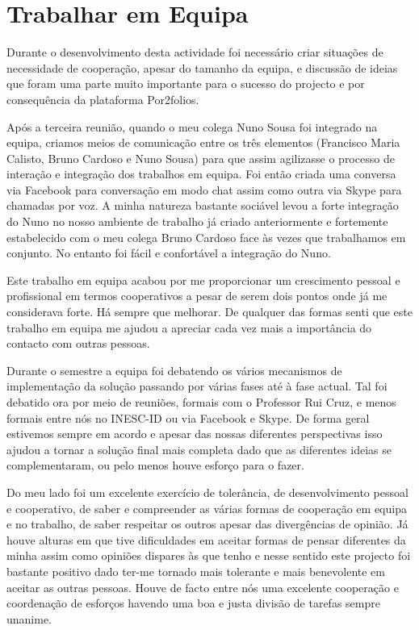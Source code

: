 \documentclass[a4paper,12pt,journal,twoside,compsoc]{PPIEEEtran}
\begin{document}

\clearpage

\section{Trabalhar em Equipa}

Durante o desenvolvimento desta actividade foi necessário criar situações de necessidade de cooperação, apesar do tamanho da equipa, e discussão de ideias que foram uma parte muito importante para o sucesso do projecto e por consequência da plataforma Por2folios.

Após a terceira reunião, quando o meu colega Nuno Sousa foi integrado na equipa, criamos meios de comunicação entre os três elementos (Francisco Maria Calisto, Bruno Cardoso e Nuno Sousa) para que assim agilizasse o processo de interação e integração dos trabalhos em equipa. Foi então criada uma conversa via Facebook para conversação em modo chat assim como outra via Skype para chamadas por voz. A minha natureza bastante sociável levou a forte integração do Nuno no nosso ambiente de trabalho já criado anteriormente e fortemente estabelecido com o meu colega Bruno Cardoso face às vezes que trabalhamos em conjunto. No entanto foi fácil e confortável a integração do Nuno.

Este trabalho em equipa acabou por me proporcionar um crescimento pessoal e profissional em termos cooperativos a pesar de serem dois pontos onde já me considerava forte. Há sempre que melhorar. De qualquer das formas senti que este trabalho em equipa me ajudou a apreciar cada vez mais a importância do contacto com outras pessoas.

Durante o semestre a equipa foi debatendo os vários mecanismos de implementação da solução passando por várias fases até à fase actual. Tal foi debatido ora por meio de reuniões, formais com o Professor Rui Cruz, e menos formais entre nós no \ac{INESC-ID} ou via Facebook e Skype. De forma geral estivemos sempre em acordo e apesar das nossas diferentes perspectivas isso ajudou a tornar a solução final mais completa dado que as diferentes ideias se complementaram, ou pelo menos houve esforço para o fazer.

Do meu lado foi um excelente exercício de tolerância, de desenvolvimento pessoal e cooperativo, de saber e compreender as várias formas de cooperação em equipa e no trabalho, de saber respeitar os outros apesar das divergências de opinião. Já houve alturas em que tive dificuldades em aceitar formas de pensar diferentes da minha assim como opiniões dispares às que tenho e nesse sentido este projecto foi bastante positivo dado ter-me tornado mais tolerante e mais benevolente em aceitar as outras pessoas. Houve de facto entre nós uma excelente cooperação e coordenação de esforços havendo uma boa e justa divisão de tarefas sempre unanime.
\end{document}
